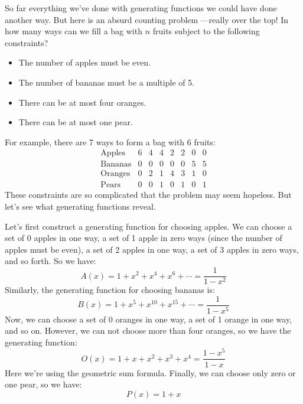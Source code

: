 So far everything we've done with generating functions we could have
done another way.  But here is an absurd counting problem ---really
over the top!  In how many ways can we fill a bag with $n$ fruits
subject to the following constraints?

\begin{itemize}
\item The number of apples must be even.
\item The number of bananas must be a multiple of 5.
\item There can be at most four oranges.
\item There can be at most one pear.
\end{itemize}

For example, there are 7 ways to form a bag with 6 fruits:
%
\[
\begin{array}{c|ccccccc}
\text{Apples}  & 6 & 4 & 4 & 2 & 2 & 0 & 0 \\
\text{Bananas} & 0 & 0 & 0 & 0 & 0 & 5 & 5 \\
\text{Oranges} & 0 & 2 & 1 & 4 & 3 & 1 & 0 \\
\text{Pears}   & 0 & 0 & 1 & 0 & 1 & 0 & 1
\end{array}
\]
These constraints are so complicated that the problem may seem
hopeless.  But let's see what generating functions reveal.

Let's first construct a generating function for choosing apples.  We
can choose a set of 0 apples in one way, a set of 1 apple in zero
ways (since the number of apples must be even), a set of 2 apples in
one way, a set of 3 apples in zero ways, and so forth.  So we have:
%
\[
A(x) = 1 + x^2 + x^4 + x^6 + \cdots = \frac{1}{1 - x^2}
\]
%
Similarly, the generating function for choosing bananas is:
%
\[
B(x) = 1 + x^5 + x^{10} + x^{15} + \cdots = \frac{1}{1 - x^5}
\]
Now, we can choose a set of 0 oranges in one way, a set of 1 orange in
one way, and so on.  However, we can not choose more than four
oranges, so we have the generating function:
%
\[
O(x) = 1 + x + x^2 + x^3 + x^4 = \frac{1-x^5}{1-x}
\]
%
Here we're using the geometric sum formula.  Finally, we can choose
only zero or one pear, so we have:
%
\[
P(x) = 1 + x
\]

